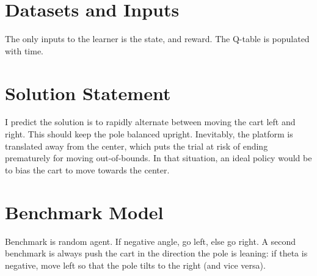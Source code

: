 \documentclass[12pt,a4paper]{article}
\begin{document}
\section*{Datasets and Inputs}
%
%
The only inputs to the learner is the state, and reward. The Q-table is populated with time.

\section*{Solution Statement}
%
%
I predict the solution is to rapidly alternate between moving the cart left and right. This should keep the pole balanced upright. Inevitably, the platform is translated away from the center, which puts the trial at risk of ending prematurely for moving out-of-bounds. In that situation, an ideal policy would be to bias the cart to move towards the center.
%
\section*{Benchmark Model}
%
%
Benchmark is random agent. If negative angle, go left, else go right. A second benchmark is always push the cart in the direction the pole is leaning: if theta is negative, move left so that the pole tilts to the right (and vice versa).
%
\end{document}
